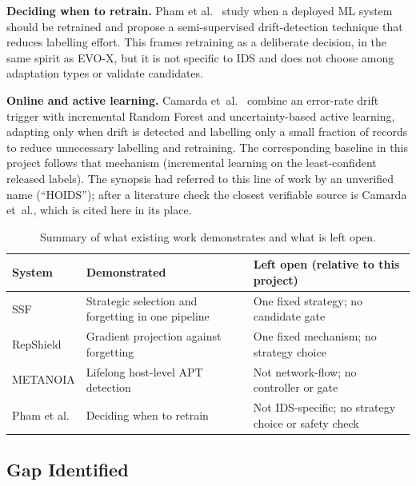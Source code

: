 \documentclass{article}
\begin{document}
\textbf{Deciding when to retrain.} Pham et al.\ \cite{pham2025retrain} study when a deployed ML system should be retrained and propose a semi-supervised drift-detection technique that reduces labelling effort. This frames retraining as a deliberate decision, in the same spirit as EVO-X, but it is not specific to IDS and does not choose among adaptation types or validate candidates.

\textbf{Online and active learning.} Camarda et~al.~\cite{camarda2025activedrift} combine an error-rate drift trigger with incremental Random Forest and uncertainty-based active learning, adapting only when drift is detected and labelling only a small fraction of records to reduce unnecessary labelling and retraining. The corresponding baseline in this project follows that mechanism (incremental learning on the least-confident released labels). The synopsis had referred to this line of work by an unverified name (``HOIDS''); after a literature check the closest verifiable source is Camarda et~al., which is cited here in its place.

\begin{table}[h]
\centering
\caption{Summary of what existing work demonstrates and what is left open.}
\label{tab:related}
\small
\begin{tabular}{p{2.6cm}p{5.2cm}p{5.4cm}}
\toprule
System & Demonstrated & Left open (relative to this project) \\
\midrule
SSF \cite{zhang2024ssf} & Strategic selection and forgetting in one pipeline & One fixed strategy; no candidate gate \\
RepShield \cite{liu2026repshield} & Gradient projection against forgetting & One fixed mechanism; no strategy choice \\
METANOIA \cite{ying2025metanoia} & Lifelong host-level APT detection & Not network-flow; no controller or gate \\
Pham et al.\ \cite{pham2025retrain} & Deciding when to retrain & Not IDS-specific; no strategy choice or safety check \\
\bottomrule
\end{tabular}
\end{table}

\subsection{Gap Identified}
\end{document}

